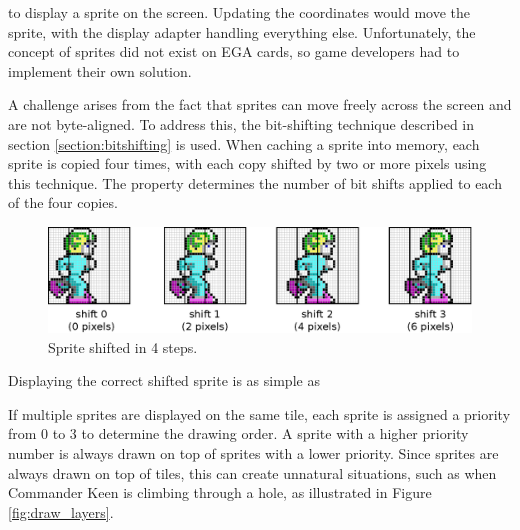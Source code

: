 \documentclass[book.tex]{subfiles}
\begin{document}
\par
to display a sprite on the screen. Updating the  coordinates would move the sprite, with the display adapter handling everything else. Unfortunately, the concept of sprites did not exist on EGA cards, so game developers had to implement their own solution.\\

\par
A challenge arises from the fact that sprites can move freely across the screen and are not byte-aligned. To address this, the bit-shifting technique described in section \ref{section:bitshifting} is used. When caching a sprite into memory, each sprite is copied four times, with each copy shifted by two or more pixels using this technique. The property  determines the number of bit shifts applied to each of the four copies.\\


\begin{figure}[H]
  \centering
  \includegraphics[width=\textwidth]{imgs/drawings/sprite_shift.eps}
  \caption{Sprite shifted in 4 steps.}
  \label{fig:sprite_shift}  
\end{figure}

\par
Displaying the correct shifted sprite is as simple as\\
\par
\begin{minipage}{\textwidth}
  
  \end{minipage}
  \label{sprite_shift}  

\par
\begin{minipage}{\textwidth}
  
  \end{minipage}
  \label{shift_sprite}
  

\par
If multiple sprites are displayed on the same tile, each sprite is assigned a priority from 0 to 3 to determine the drawing order. A sprite with a higher priority number is always drawn on top of sprites with a lower priority. Since sprites are always drawn on top of tiles, this can create unnatural situations, such as when Commander Keen is climbing through a hole, as illustrated in Figure \ref{fig:draw_layers}.\\
\end{document}
